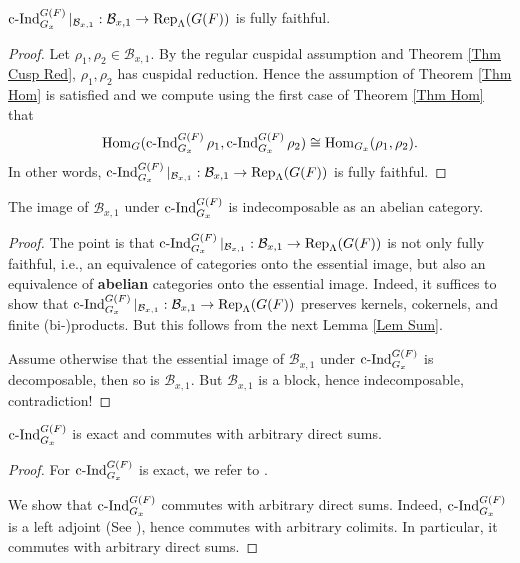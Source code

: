 	\begin{lemma}\label{Lem Thm Hom implies fully faithful}
		$\operatorname{\operatorname{c-Ind}}_{G_x}^{G(F)}|_{\mathcal{B}_{x,1}}: \mathcal{B}_{x,1} \to \operatorname{\operatorname{Rep}}_{\Lambda}(G(F))$ is fully faithful.
	\end{lemma}
	
	\begin{proof}
		Let $\rho_1, \rho_2 \in \mathcal{B}_{x,1}$. By the regular cuspidal assumption and Theorem \ref{Thm Cusp Red}, $\rho_1, \rho_2$ has cuspidal reduction. Hence the assumption of Theorem \ref{Thm Hom} is satisfied and we compute using the first case of Theorem \ref{Thm Hom} that
		$$\operatorname{\operatorname{Hom}}_G(\operatorname{\operatorname{c-Ind}}_{G_x}^{G(F)}\rho_1, \operatorname{\operatorname{c-Ind}}_{G_x}^{G(F)}\rho_2) \cong \operatorname{\operatorname{Hom}}_{G_x}(\rho_1, \rho_2).$$
		In other words, $\operatorname{\operatorname{c-Ind}}_{G_x}^{G(F)}|_{\mathcal{B}_{x,1}}: \mathcal{B}_{x,1} \to \operatorname{\operatorname{Rep}}_{\Lambda}(G(F))$ is fully faithful.
	\end{proof}
	
	\begin{lemma}\label{Lem Indec}
		The image of $\mathcal{B}_{x,1}$ under $\operatorname{\operatorname{c-Ind}}_{G_x}^{G(F)}$ is indecomposable as an abelian category.
	\end{lemma}
	
	\begin{proof}
		The point is that $\operatorname{\operatorname{c-Ind}}_{G_x}^{G(F)}|_{\mathcal{B}_{x,1}}: \mathcal{B}_{x,1} \to \operatorname{\operatorname{Rep}}_{\Lambda}(G(F))$ is not only fully faithful, i.e., an equivalence of categories onto the essential image, but also an equivalence of \textbf{abelian} categories onto the essential image. Indeed, it suffices to show that $\operatorname{\operatorname{c-Ind}}_{G_x}^{G(F)}|_{\mathcal{B}_{x,1}}: \mathcal{B}_{x,1} \to \operatorname{\operatorname{Rep}}_{\Lambda}(G(F))$ preserves kernels, cokernels, and finite (bi-)products. But this follows from the next Lemma \ref{Lem Sum}.
		
		Assume otherwise that the essential image of $\mathcal{B}_{x,1}$ under $\operatorname{\operatorname{c-Ind}}_{G_x}^{G(F)}$ is decomposable, then so is $\mathcal{B}_{x,1}$. But $\mathcal{B}_{x,1}$ is a block, hence indecomposable, contradiction!
	\end{proof}
	
	\begin{lemma}\label{Lem Sum}
		$\operatorname{\operatorname{c-Ind}}_{G_x}^{G(F)}$ is exact and commutes with arbitrary direct sums.
	\end{lemma}
	
	\begin{proof}
		For $\operatorname{\operatorname{c-Ind}}_{G_x}^{G(F)}$ is exact, we refer to \cite[I.5.10]{vigneras1996representations}.
		
		We show that $\operatorname{\operatorname{c-Ind}}_{G_x}^{G(F)}$ commutes with arbitrary direct sums. Indeed, $\operatorname{\operatorname{c-Ind}}_{G_x}^{G(F)}$ is a left adjoint (See \cite[I.5.7]{vigneras1996representations}), hence commutes with arbitrary colimits. In particular, it commutes with arbitrary direct sums.
	\end{proof}
	
